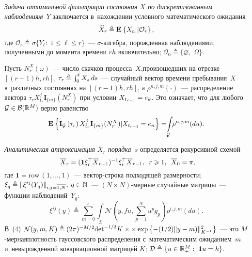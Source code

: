 \begin{multicols}{2}
 \textit{Задача оптимальной фильтрации состояния $X$ по дискретизованным 
наблюдениям~$Y$} заключается в~нахождении условного математического 
ожидания
 \begin{equation*}
 \widehat{X}_r \triangleq \mathbf{E}_{  }\left\{ \mathop{X_{t_r}|\mathcal{O}_{r} } \right\},
 \end{equation*}
 где $\mathcal{O}_r \triangleq \sigma\{ Y_{\ell}: \; 1 \leqslant \ell 
\leqslant r\}$~--- $\sigma$-ал\-геб\-ра, по\-рож\-ден\-ная наблюдениями, 
полученными до момента времени $rh$ включительно; $\mathcal{O}_0 
\triangleq \{\varnothing,\; \Omega\}$.

 Пусть $N_r^X(\omega)$~--- число скачков процесса~$X$,\linebreak произошедших на 
отрезке $[(r-1)h,rh]$, $\tau_r\hm \triangleq \int\nolimits_0^t X_s\,ds$~--- 
случайный вектор времени пребывания~$X$ в~различных состояниях на  
$[(r-1)h,rh]$, а
 $\rho^{n,j,m}(\cdot)$~--- распределение вектора
 $\tau_{r}X_{t_{r}}^{j}\mathbf{I}_{\{m\}}(N_{r}^X)$ при условии $X_{t_{r-
1}}\hm=e_k$. Это означает, что
 для любого $\mathcal{G} \hm\in \mathcal{B}(\mathbb{R}^M)$ верно 
равенство
 $$
\mathbf{E}_{  }\left\{ \mathop{\mathbf{I}_{\mathcal{G}}\left(\tau_r\right)X_{t_r}^j
\mathbf{I}_{\{m\}}(N_r^X)|X_{t_{r-1}}=e_n} \right\}
=
 \hspace*{-3pt}\int\limits_{\mathcal{G}}\hspace*{-3pt} \rho^{n,j,m}(du).
 $$

\textit{Аналитическая аппроксимация $\overline{X}_r$ порядка~$s$} 
опре\-де\-ля\-ет\-ся рекурсивной схемой
 \begin{equation}
\overline{X}_r = (\mathbf{1}\xi_{r}^{\top}\overline{X}_{r-1})^{-1} 
\xi_{r}^{\top}\overline{X}_{r-1}, \enskip r \geqslant 1, \enskip 
\overline{X}_0=\pi,\!\!
 \label{eq:filt_3}
 \end{equation}
 где $\mathbf{1} = \mathrm{row}\, (1,\ldots,1)$~--- вектор-строка 
подходящей размерности;
$\xi_q \triangleq \|\xi^{ij}(Y_q)\|_{i,j=\overline{1,N}},\; q \hm\in 
\mathbb{N}$~--- $(N \times N)$-мер\-ные случайные матрицы~--- функции 
наблюдений~$Y_q$:
 \begin{equation} %
 \xi^{ij}(y)\triangleq
\sum\limits_{m=0}^s \int\limits_{\mathcal{D}}
 \mathcal{N}\left(y,f u,\sum_{p=1}^N u^p g_p\right)
 \rho^{i,j,m}(du).
 \label{eq:xi_def}
 \end{equation}
 В~(4) 
 $\mathcal{N}(y,m,K) \triangleq (2\pi)^{-M/2} \mathrm{det}^{-1/2} K \times\linebreak
 \times
\exp\left\{ -({1}/{2})\|y-m)\|^2_{K^{-1}}\right\}
 $~--- это $M$-мер\-ная\linebreak плот\-ность гауссовского распределения с~математическим 
ожиданием~$m$ и~невырожденной ковариационной матрицей $K$; $\mathcal{D} 
\triangleq \{u \hm\in \mathbb{R}^M_+:\; \mathbf{1}u=h\}$.


\end{multicols}
